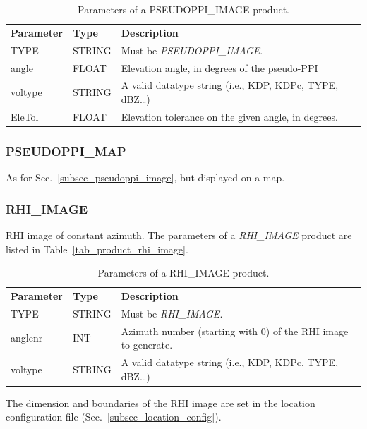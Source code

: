 \documentclass[a4paper,11pt,pdftex,twoside]{scrartcl}
\renewcommand{\bf}{\normalfont \bfseries}
\begin{document}
{{{\begin{table}[H]
 \begin{tabularx}{\textwidth}{llX}
 \bf{Parameter}  & \bf{Type}  & \bf{Description}\\
 TYPE           & STRING     & Must be \emph{PSEUDOPPI\_IMAGE}.\\
 angle          & FLOAT      & Elevation angle, in degrees of the pseudo-PPI \\
 voltype        & STRING     & A valid datatype string (i.e., KDP, KDPc, TYPE, dBZ\dots)\\
 EleTol         & FLOAT      & Elevation tolerance on the given angle, in degrees. \\
 \end{tabularx}
 \caption{Parameters of a PSEUDOPPI\_IMAGE product.}
 \label{tab_product_pseudoppi_image}
\end{table}

\subsubsection{PSEUDOPPI\_MAP}
   \label{subsec_pseudoppi_map}
As for Sec.~\ref{subsec_pseudoppi_image}, but displayed on a map. 

\subsubsection*{RHI\_IMAGE}
   \label{subsec_rhi_image}
RHI image of constant azimuth.
The parameters of a \emph{RHI\_IMAGE} product are listed in Table~\ref{tab_product_rhi_image}.

\begin{table}[H]
 \begin{tabularx}{\textwidth}{llX}
 \bf{Parameter}  & \bf{Type}  & \bf{Description}\\
 TYPE           & STRING     & Must be \emph{RHI\_IMAGE}.\\
 anglenr        & INT        & Azimuth number (starting with 0) of the RHI image
                               to generate.\\
 voltype        & STRING     &  A valid datatype string (i.e., KDP, KDPc, TYPE, dBZ\dots)\\

 \end{tabularx}
 \caption{Parameters of a RHI\_IMAGE product.}
 \label{tab_product_ppi_image}
\end{table}
 The dimension and boundaries of the RHI image are set in the location configuration file (Sec.~\ref{subsec_location_config}).



}}}
\end{document}
